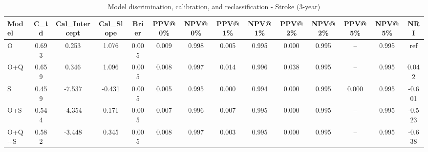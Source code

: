 \begin{table}[htbp]
\centering
\small
\caption{Model discrimination, calibration, and reclassification - Stroke (3-year)}
\label{tab:perf_stroke_3y}
\begin{tabular}{lccccccccccccc}
\toprule
Model & C\_td & Cal\_Intercept & Cal\_Slope & Brier & PPV@0\% & NPV@0\% & PPV@1\% & NPV@1\% & PPV@2\% & NPV@2\% & PPV@5\% & NPV@5\% & NRI \\
\midrule
O & 0.693 & 0.253 & 1.076 & 0.005 & 0.009 & 0.998 & 0.005 & 0.995 & 0.000 & 0.995 & -- & 0.995 & ref \\
O+Q & 0.659 & 0.346 & 1.096 & 0.005 & 0.008 & 0.997 & 0.014 & 0.996 & 0.038 & 0.995 & -- & 0.995 & 0.042 \\
S & 0.459 & -7.537 & -0.431 & 0.005 & 0.005 & 0.995 & 0.000 & 0.994 & 0.000 & 0.995 & 0.000 & 0.995 & -0.601 \\
O+S & 0.544 & -4.354 & 0.171 & 0.005 & 0.007 & 0.996 & 0.007 & 0.995 & 0.000 & 0.995 & -- & 0.995 & -0.523 \\
O+Q+S & 0.582 & -3.448 & 0.345 & 0.005 & 0.008 & 0.997 & 0.003 & 0.995 & 0.000 & 0.995 & -- & 0.995 & -0.638 \\
\bottomrule
\end{tabular}
\end{table}